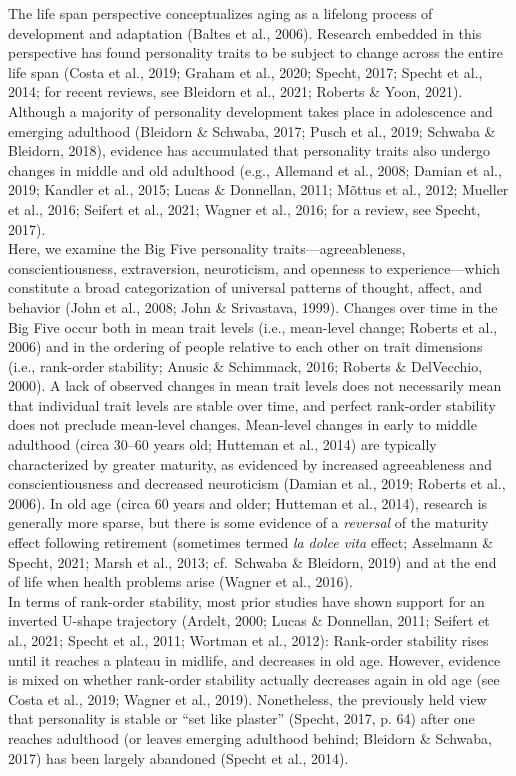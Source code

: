 \documentclass[
  english,
  man,floatsintext]{apa7}
\begin{document}
The life span perspective conceptualizes aging as a lifelong process of development and adaptation (Baltes et al., 2006). Research embedded in this perspective has found personality traits to be subject to change across the entire life span (Costa et al., 2019; Graham et al., 2020; Specht, 2017; Specht et al., 2014; for recent reviews, see Bleidorn et al., 2021; Roberts \& Yoon, 2021). Although a majority of personality development takes place in adolescence and emerging adulthood (Bleidorn \& Schwaba, 2017; Pusch et al., 2019; Schwaba \& Bleidorn, 2018), evidence has accumulated that personality traits also undergo changes in middle and old adulthood (e.g., Allemand et al., 2008; Damian et al., 2019; Kandler et al., 2015; Lucas \& Donnellan, 2011; Mõttus et al., 2012; Mueller et al., 2016; Seifert et al., 2021; Wagner et al., 2016; for a review, see Specht, 2017).\\
Here, we examine the Big Five personality traits---agreeableness, conscientiousness, extraversion, neuroticism, and openness to experience---which constitute a broad categorization of universal patterns of thought, affect, and behavior (John et al., 2008; John \& Srivastava, 1999). Changes over time in the Big Five occur both in mean trait levels (i.e., mean-level change; Roberts et al., 2006) and in the ordering of people relative to each other on trait dimensions (i.e., rank-order stability; Anusic \& Schimmack, 2016; Roberts \& DelVecchio, 2000). A lack of observed changes in mean trait levels does not necessarily mean that individual trait levels are stable over time, and perfect rank-order stability does not preclude mean-level changes. Mean-level changes in early to middle adulthood (circa 30--60 years old; Hutteman et al., 2014) are typically characterized by greater maturity, as evidenced by increased agreeableness and conscientiousness and decreased neuroticism (Damian et al., 2019; Roberts et al., 2006). In old age (circa 60 years and older; Hutteman et al., 2014), research is generally more sparse, but there is some evidence of a \emph{reversal} of the maturity effect following retirement (sometimes termed \emph{la dolce vita} effect; Asselmann \& Specht, 2021; Marsh et al., 2013; cf.~Schwaba \& Bleidorn, 2019) and at the end of life when health problems arise (Wagner et al., 2016).\\
In terms of rank-order stability, most prior studies have shown support for an inverted U-shape trajectory (Ardelt, 2000; Lucas \& Donnellan, 2011; Seifert et al., 2021; Specht et al., 2011; Wortman et al., 2012): Rank-order stability rises until it reaches a plateau in midlife, and decreases in old age. However, evidence is mixed on whether rank-order stability actually decreases again in old age (see Costa et al., 2019; Wagner et al., 2019). Nonetheless, the previously held view that personality is stable or \enquote{set like plaster} (Specht, 2017, p. 64) after one reaches adulthood (or leaves emerging adulthood behind; Bleidorn \& Schwaba, 2017) has been largely abandoned (Specht et al., 2014).\\
\end{document}
